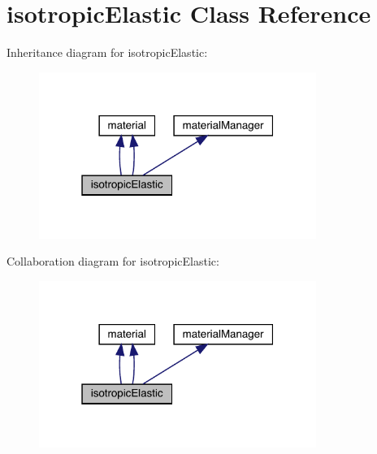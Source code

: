 \hypertarget{classisotropic_elastic}{}\section{isotropic\+Elastic Class Reference}
\label{classisotropic_elastic}


Inheritance diagram for isotropic\+Elastic\+:
\nopagebreak
\begin{figure}[H]
\begin{center}
\leavevmode
\includegraphics[width=256pt]{classisotropic_elastic__inherit__graph}
\end{center}
\end{figure}


Collaboration diagram for isotropic\+Elastic\+:
\nopagebreak
\begin{figure}[H]
\begin{center}
\leavevmode
\includegraphics[width=256pt]{classisotropic_elastic__coll__graph}
\end{center}
\end{figure}
